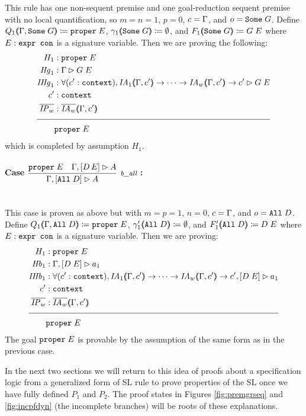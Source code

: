 This rule has one non-sequent premise and one goal-reduction sequent premise with no local quantification, so $m = n = 1$, $p = 0$, $c = \Gamma{}$, and $o = \texttt{Some} \; G$. Define $Q_1 (\hspace{-0.35em} \langle \Gamma{} , \texttt{Some} \; G \rangle \hspace{-0.35em}) \coloneqq \texttt{proper} \; E$, $\gamma_1 (\hspace{-0.35em} \langle \texttt{Some} \; G \rangle \hspace{-0.35em}) \coloneqq \emptyset$, and $F_1 (\hspace{-0.35em} \langle \texttt{Some} \; G \rangle \hspace{-0.35em}) \coloneqq G \; E$ where $E : \texttt{expr con}$ is a signature variable. Then we are proving the following:
\begin{align*}
H_1 &: \sltm{proper} \; E \\
\mathit{Hg}_1 &: \seqsl{G \; E} \\
\mathit{IHg}_1 &: \forall (\inddyncon{} : \sltm{context}), \mathit{IA}_1 \args{\dyncon{} , \inddyncon{}} \rightarrow \dots \rightarrow \mathit{IA}_w \args{\dyncon{} , \inddyncon{}} \rightarrow \seqsl[\inddyncon{}]{G \; E} \\
\inddyncon{} &: \sltm{context} \\
\ol{\mathit{IP}_w} &: \ol{\mathit{IA}_w} \args{\dyncon{} , \inddyncon{}} \\[\pfshift{}]
\cline{1-2}
& \sltm{proper} \; E
\end{align*}
which is completed by assumption $H_1$.

\paragraph{Case $\vcenter{\rlball{}}$ :} ~\\

This case is proven as above but with $m = p = 1$, $n = 0$, $c = \Gamma{}$, and $o = \texttt{All} \; D$. Define $Q_1 (\hspace{-0.35em} \langle \Gamma{} , \texttt{All} \; D
  \rangle \hspace{-0.35em}) \coloneqq \texttt{proper} \; E$, $\gamma'_1 (\hspace{-0.35em} \langle \texttt{All} \; D \rangle \hspace{-0.35em}) \coloneqq \emptyset$, and $F'_1 (\hspace{-0.35em} \langle \texttt{All} \; D \rangle \hspace{-0.35em}) \coloneqq D \; E$ where $E : \texttt{expr con}$ is a signature variable. Then we are proving:
\begin{align*}
H_1 &: \sltm{proper} \; E \\
\mathit{Hb}_1 &: \bchsl{D \; E}{a_1} \\
\mathit{IHb}_1 &: \forall (\inddyncon{} : \sltm{context}), \mathit{IA}_1 \args{\dyncon{} , \inddyncon{}} \rightarrow \dots \rightarrow \mathit{IA}_w \args{\dyncon{} , \inddyncon{}} \rightarrow \bchsl[\inddyncon{}]{D \; E}{a_1} \\
\inddyncon{} &: \sltm{context} \\
\ol{\mathit{IP}_w} &: \ol{\mathit{IA}_w} \args{\dyncon{} , \inddyncon{}} \\[\pfshift{}]
\cline{1-2}
& \sltm{proper} \; E
\end{align*}
The goal $\texttt{proper} \; E$ is provable by the assumption of the same form as in the previous case.

\medskip

In the next two sections we will return to this idea of proofs about a specification logic from a generalized form of SL rule to prove properties of the SL once we have fully defined $P_1$ and $P_2$. The proof states in Figures \ref{fig:premgrseq} and \ref{fig:incpfdyn} (the incomplete branches) will be roots of these explanations.
